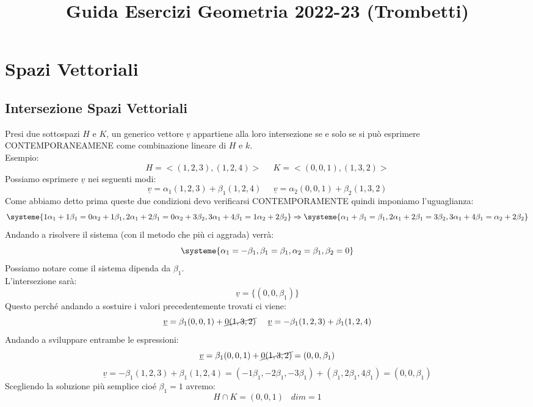 \documentclass[12pt,a4paper]{article}
\title{Guida Esercizi Geometria 2022-23 (Trombetti)}
\author{}
\date{}
\begin{document}
\maketitle
\tableofcontents

\newpage

\section{Spazi Vettoriali}

\subsection{Intersezione Spazi Vettoriali}
Presi due sottospazi $H$ e $K$, un generico vettore $\underline{v}$ appartiene alla loro intersezione se e solo se si può esprimere CONTEMPORANEAMENE come combinazione lineare di $H$ e $k$.\\
Esempio:\\
$$ H=<(1,2,3),(1,2,4)> \;\;\;\;\; K=<(0,0,1),(1,3,2)> $$
Possiamo esprimere $\underline{v}$ nei seguenti modi:
$$ \underline{v}=\alpha_1(1,2,3)+\beta_1(1,2,4) \;\;\;\;\; \underline{v}=\alpha_2(0,0,1)+\beta_2(1,3,2)$$
Come abbiamo detto prima queste due condizioni devo verificarsi CONTEMPORAMENTE quindi imponiamo l'uguaglianza:
$$ 
\systeme{1\alpha_1+1\beta_1 = 0\alpha_2+1\beta_1, 2\alpha_1+2\beta_1=0\alpha_2+3\beta_2, 3\alpha_1+4\beta_1 = 1\alpha_2+2\beta_2}
\Rightarrow
\systeme{\alpha_1+\beta_1 = \beta_1, 2\alpha_1+2\beta_1=3\beta_2, 3\alpha_1+4\beta_1 = \alpha_2+2\beta_2}
$$
Andando a risolvere il sistema (con il metodo che più ci aggrada) verrà:
$$
\systeme{\alpha_1=-\beta_1, \beta_1=\beta_1, \alpha_2=\beta_1, \beta_2=0}
$$
Possiamo notare come il sistema dipenda da $\beta_1$.\\
L'intersezione sarà:
$$ \underline{v}=\{(0,0,\beta_1)\} $$
Questo perché andando a sostuire i valori precedentemente trovati ci viene:
$$ \underline{v}=\beta_1(0,0,1)+\cancel{0(1,3,2)} \;\;\;\;\; \underline{v}=-\beta_1(1,2,3)+\beta_1(1,2,4) $$
Andando a sviluppare entrambe le espressioni:
$$ \underline{v}=\beta_1(0,0,1)+\cancel{0(1,3,2)} = (0,0,\beta_1)$$
$$\underline{v}=-\beta_1(1,2,3)+\beta_1(1,2,4) = (-1\beta_1,-2\beta_1,-3\beta_1)+(\beta_1,2\beta_1,4\beta_1) = (0,0,\beta_1) $$
Scegliendo la soluzione più semplice cioé $\beta_1=1$ avremo:
$$ H \cap K = (0,0,1) \;\;\; dim=1 $$
\end{document}
